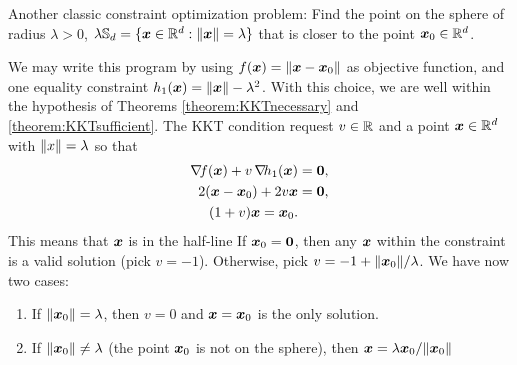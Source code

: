 \begin{example}
Another classic constraint optimization problem: Find the point on the sphere of radius $\lambda>0$, $\lambda\mathbb{S}_d = \{ \boldsymbol{x} \in \mathbb{R}^d : \lVert \boldsymbol{x} \rVert=\lambda \}$ that is closer to the point $\boldsymbol{x}_0 \in \mathbb{R}^d$.

We may write this program by using $f(\boldsymbol{x})=\lVert \boldsymbol{x}-\boldsymbol{x}_0 \rVert$ as objective function, and one equality constraint $h_1(\boldsymbol{x})=\lVert \boldsymbol{x} \rVert-\lambda^2$.  With this choice, we are well within the hypothesis of Theorems \ref{theorem:KKTnecessary} and \ref{theorem:KKTsufficient}.  The KKT condition request $v \in \mathbb{R}$ and a point $\boldsymbol{x} \in \mathbb{R}^d$ with $\lVert x \rVert = \lambda$ so that
\begin{align*} 
\mathop{\nabla\! {f}}(\boldsymbol{x}) + v\mathop{\nabla\! {h_1}}(\boldsymbol{x}) &= \boldsymbol{0}, \\
2(\boldsymbol{x}-\boldsymbol{x}_0)+2v\boldsymbol{x} &= \boldsymbol{0}, \\
(1+v)\boldsymbol{x} = \boldsymbol{x}_0.
\end{align*}
This means that $\boldsymbol{x}$ is in the half-line 
If $\boldsymbol{x}_0 = \boldsymbol{0}$, then any $\boldsymbol{x}$ within the constraint is a valid solution (pick $v=-1$).  Otherwise, pick $v = -1+\lVert \boldsymbol{x}_0 \rVert/\lambda$.  We have now two cases:
\begin{enumerate}
	\item If $\lVert \boldsymbol{x}_0 \rVert=\lambda$, then $v=0$ and $\boldsymbol{x}=\boldsymbol{x}_0$ is the only solution.
	\item If $\lVert \boldsymbol{x}_0 \rVert \neq\lambda$ (the point $\boldsymbol{x}_0$ is not on the sphere), then $\boldsymbol{x} = \lambda\boldsymbol{x}_0/\lVert \boldsymbol{x}_0 \rVert$
\end{enumerate}
\end{example}
